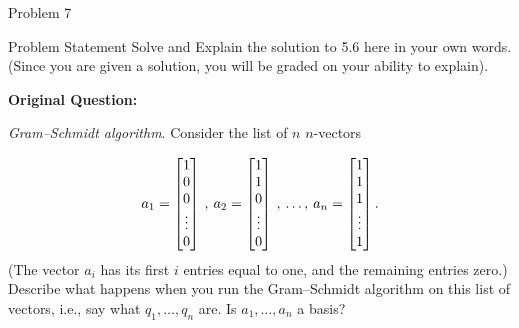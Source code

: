 \begin{problem}{Problem 7}
    \begin{statement}{Problem Statement}
        Solve and Explain the solution to 5.6 here in your own words. (Since you are given a solution, you will be graded on your ability to explain). \vspace*{1em}

        \textbf{Original Question:} \vspace*{1em}

        \textit{Gram–Schmidt algorithm}. Consider the list of $n$ $n$-vectors 

        \begin{equation*}
            a_{1} = 
            \begin{bmatrix}
                1 \\
                0 \\
                0 \\
                \vdots \\
                0 \\
            \end{bmatrix}
            \hspace*{2pt} , \hspace*{2pt}
            a_{2} = 
            \begin{bmatrix}
                1 \\
                1 \\
                0 \\
                \vdots \\
                0 \\
            \end{bmatrix}
            \hspace*{2pt} , \hspace*{2pt} \dots , \hspace*{2pt}
            a_{n} = 
            \begin{bmatrix}
                1 \\
                1 \\
                1 \\
                \vdots \\
                1 \\
            \end{bmatrix}.
        \end{equation*}
        (The vector $a_{i}$ has its first $i$ entries equal to one, and the remaining entries zero.) Describe what happens when you run the Gram–Schmidt algorithm on this list of vectors, i.e., say 
        what $q_{1}, \dots , q_{n}$ are. Is $a_{1}, \dots , a_{n}$ a basis?
    \end{statement}


\end{problem}
